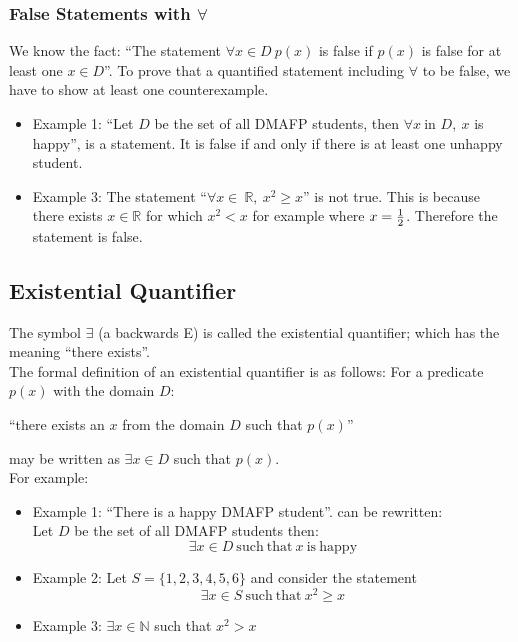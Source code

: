 \subsubsection{False Statements with $\forall$}
We know the fact: ``The statement $\forall x \in D\ p(x)$ is false if $p(x)$ is false for at least one $x \in D$''. To prove that a quantified statement including $\forall$ to be false, we have to show at least one counterexample.
\begin{itemize}
    \item Example 1: ``Let $D$ be the set of all DMAFP students, then $\forall x\ \text{in } D,\ x$ is happy'', is a statement. It is false if and only if there is at least one unhappy student.
    \item Example 3: The statement ``$\forall x \in \ \mathbb{R},\ x^2 \geq x$'' is not true. This is because there exists $x \in \mathbb{R}$ for which $x^2 < x$ for example where $x=\frac{1}{2} \displaystyle$. Therefore the statement is false. 
\end{itemize}

\subsection{Existential Quantifier}
The symbol $\exists$ (a backwards E) is called the existential quantifier; which has the meaning ``there exists''. \\

The formal definition of an existential quantifier is as follows: For a predicate $p(x)$ with the domain $D$:
\begin{center}
    ``there exists an $x$ from the domain $D$ such that $p(x)$''
\end{center}
may be written as $\exists x \in D$ such that $p(x)$.\\

For example:
\begin{itemize}
    \item Example 1: ``There is a happy DMAFP student''. can be rewritten:\\
    Let $D$ be the set of all DMAFP students then:
    \[\exists x \in D \mathrm{\ such\ that\ } x \mathrm{\ is\ happy}\]
    \item Example 2: Let $S = \{1, 2, 3, 4, 5, 6 \}$ and consider the statement
    \[\exists x \in S \mathrm{\ such\ that\ } x^2 \geq x\] 
    \item Example 3: $\exists x \in \mathbb{N}$ such that $x^2 >x$
\end{itemize}
